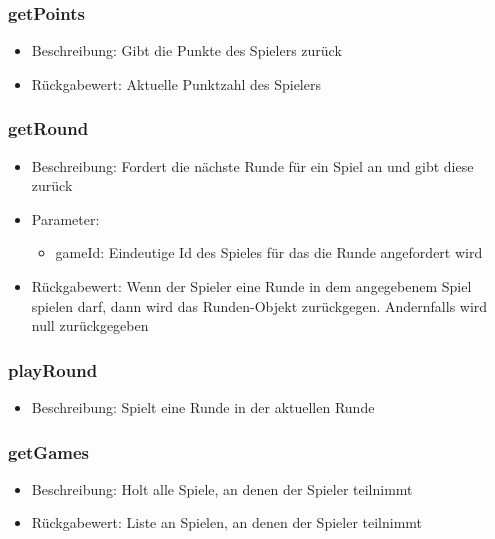 \documentclass[a4paper]{scrreprt}
\begin{document}
    \subsubsection{getPoints}
    \begin{itemize}
        \item Beschreibung: Gibt die Punkte des Spielers zurück
        \item Rückgabewert: Aktuelle Punktzahl des Spielers 
    \end{itemize}
    \subsubsection{getRound}
    \begin{itemize}
        \item Beschreibung: Fordert die nächste Runde für ein Spiel an und gibt diese zurück
        \item Parameter:
        \begin{itemize}
            \item gameId: Eindeutige Id des Spieles für das die Runde angefordert wird
        \end{itemize}
        \item Rückgabewert: Wenn der Spieler eine Runde in dem angegebenem Spiel spielen darf, dann wird das Runden-Objekt zurückgegen. Andernfalls wird null zurückgegeben 
    \end{itemize}
    \subsubsection{playRound}
    \begin{itemize}
        \item Beschreibung: Spielt eine Runde in der aktuellen Runde
    \end{itemize}
    \subsubsection{getGames}
    \begin{itemize}
        \item Beschreibung: Holt alle Spiele, an denen der Spieler teilnimmt
        \item Rückgabewert: Liste an Spielen, an denen der Spieler teilnimmt 
    \end{itemize}
\end{document}
